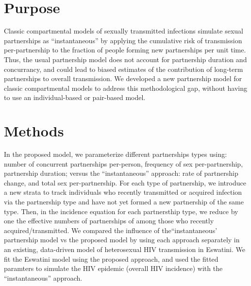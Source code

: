 \section{Purpose} %
Classic compartmental models of sexually transmitted infections
simulate sexual partnerships as ``instantaneous'' by
applying the cumulative risk of transmission per-partnership
to the fraction of people forming new partnerships per unit time. 
Thus, the usual partnership model does not account for partnership duration %
and concurrancy, and could lead to biased estimates of the contribution of
long-term partnerships to overall transmission.
We developed a new partnership model for classic compartmental models to address this methodological gap, without 
having to use an individual-based or pair-based model.
\section{Methods}
In the proposed model, we parameterize different partnerships types using:
number of concurrent partnerships per-person, frequency of sex per-partnership, partnership duration;
versus the ``instantaneous'' approach: rate of partnership change, and total sex per-partnership. %
For each type of partnership, we introduce a new strata to track individuals %
who recently transmitted or acquired infection via the partnership type and 
have not yet formed a new partnership of the same type.
Then, in the incidence equation for each partnersthip type, we reduce by one
the effective numbers of partnerships of among those who recently acquired/transmitted. %
We compared the influence of the``instantaneous' partnership model vs the proposed model by using each 
approach separately in an existing, data-driven model of heterosexual HIV transmission in Eswatini. 
We fit the Eswatini model using the proposed approach, 
and used the fitted paramters to simulate the HIV epidemic (overall HIV incidence) with the ``instantaneous''  approach.

